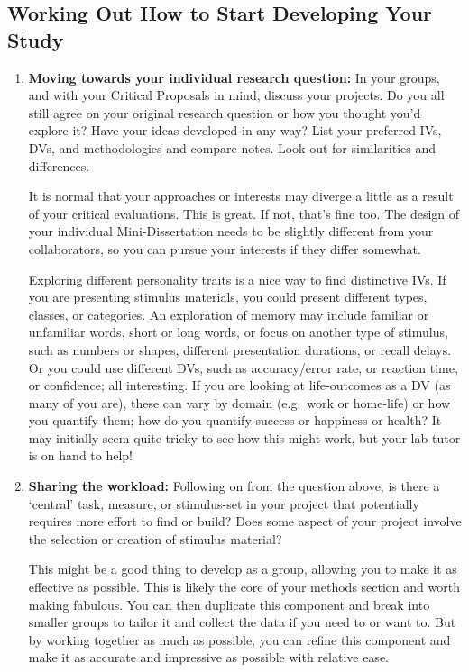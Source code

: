 \documentclass[
  letterpaper,
  DIV=11,
  numbers=noendperiod]{scrartcl}
\begin{document}
\subsection{Working Out How to Start Developing Your
Study}\label{working-out-how-to-start-developing-your-study}

\begin{enumerate}
\def\labelenumi{\arabic{enumi}.}
\item
  \textbf{Moving towards your individual research question:} In your
  groups, and with your Critical Proposals in mind, discuss your
  projects. Do you all still agree on your original research question or
  how you thought you'd explore it? Have your ideas developed in any
  way? List your preferred IVs, DVs, and methodologies and compare
  notes. Look out for similarities and differences.

  It is normal that your approaches or interests may diverge a little as
  a result of your critical evaluations. This is great. If not, that's
  fine too. The design of your individual Mini-Dissertation needs to be
  slightly different from your collaborators, so you can pursue your
  interests if they differ somewhat.

  Exploring different personality traits is a nice way to find
  distinctive IVs. If you are presenting stimulus materials, you could
  present different types, classes, or categories. An exploration of
  memory may include familiar or unfamiliar words, short or long words,
  or focus on another type of stimulus, such as numbers or shapes,
  different presentation durations, or recall delays. Or you could use
  different DVs, such as accuracy/error rate, or reaction time, or
  confidence; all interesting. If you are looking at life-outcomes as a
  DV (as many of you are), these can vary by domain (e.g.~work or
  home-life) or how you quantify them; how do you quantify success or
  happiness or health? It may initially seem quite tricky to see how
  this might work, but your lab tutor is on hand to help!
\item
  \textbf{Sharing the workload:} Following on from the question above,
  is there a `central' task, measure, or stimulus-set in your project
  that potentially requires more effort to find or build? Does some
  aspect of your project involve the selection or creation of stimulus
  material?

  This might be a good thing to develop as a group, allowing you to make
  it as effective as possible. This is likely the core of your methods
  section and worth making fabulous. You can then duplicate this
  component and break into smaller groups to tailor it and collect the
  data if you need to or want to. But by working together as much as
  possible, you can refine this component and make it as accurate and
  impressive as possible with relative ease.
\end{enumerate}
\end{document}
